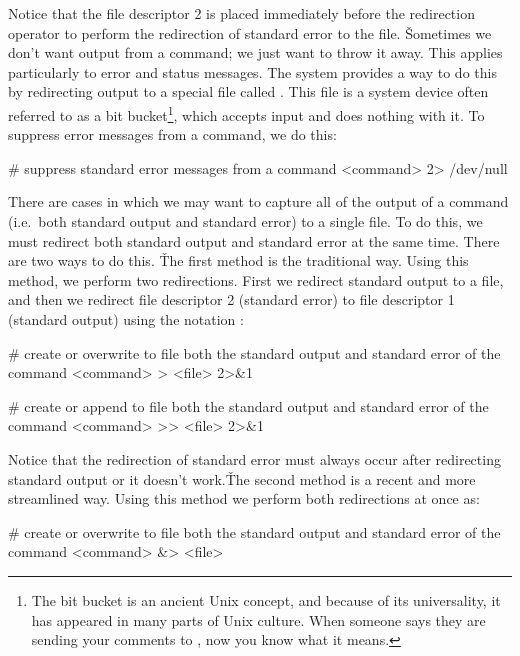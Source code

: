 Notice that the file descriptor 2 is placed immediately before the redirection operator to perform the redirection of
standard error to the file. \v

Sometimes we don't want output from a command; we just want to throw it away. This applies particularly to error and
status messages. The system provides a way to do this by redirecting output to a special file called .
This file is a system device often referred to as a bit bucket\footnote{The bit bucket is an ancient Unix concept,
and because of its universality, it has appeared in many parts of Unix culture. When someone says they are sending
your comments to , now you know what it means.}, which accepts input and does nothing with it. To
suppress error messages from a command, we do this:
\begin{bash}
# suppress standard error messages from a command
<command> 2> /dev/null
\end{bash}

There are cases in which we may want to capture all of the output of a command (i.e.\ both standard output and
standard error) to a single file. To do this, we must redirect both standard output and standard error at the same
time. There are two ways to do this. \v

The first method is the traditional way. Using this method, we perform two redirections. First we redirect standard
output to a file, and then we redirect file descriptor 2 (standard error) to file descriptor 1 (standard output)
using the notation :
\begin{bash}
# create or overwrite to file both the standard output and standard error of the command
<command> > <file> 2>&1
\end{bash}

\begin{bash}
# create or append to file both the standard output and standard error of the command
<command> >> <file> 2>&1
\end{bash}

Notice that the redirection of standard error must always occur after redirecting standard output or it doesn't work.\v

The second method is a recent and more streamlined way. Using this method we perform both redirections at once as:
\begin{bash}
# create or overwrite to file both the standard output and standard error of the command
<command> &> <file>
\end{bash}

